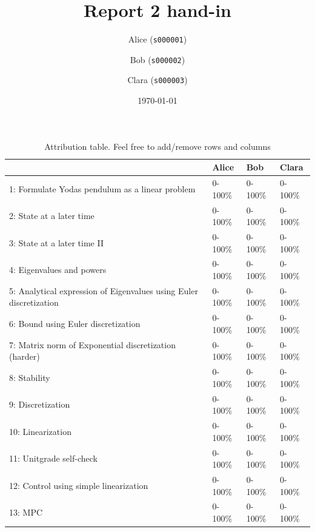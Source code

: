 \documentclass[12pt,twoside]{article}
\title{ Report 2 hand-in }
\date{ \today }
\author{Alice (\texttt{s000001})\and  Bob (\texttt{s000002})\and Clara (\texttt{s000003}) }
\begin{document}
\maketitle

\begin{table}[ht!]
\caption{Attribution table. Feel free to add/remove rows and columns}
\begin{tabular}{llll}
\toprule
                                                                    & Alice   & Bob    & Clara   \\
\midrule
 1: Formulate Yodas pendulum as a linear problem                    & 0-100\%  & 0-100\% & 0-100\%  \\
 2: State at a later time                                           & 0-100\%  & 0-100\% & 0-100\%  \\
 3: State at a later time II                                        & 0-100\%  & 0-100\% & 0-100\%  \\
 4: Eigenvalues and powers                                          & 0-100\%  & 0-100\% & 0-100\%  \\
 5: Analytical expression of Eigenvalues using Euler discretization & 0-100\%  & 0-100\% & 0-100\%  \\
 6: Bound using Euler discretization                                & 0-100\%  & 0-100\% & 0-100\%  \\
 7: Matrix norm of Exponential discretization (harder)              & 0-100\%  & 0-100\% & 0-100\%  \\
 8: Stability                                                       & 0-100\%  & 0-100\% & 0-100\%  \\
 9: Discretization                                                  & 0-100\%  & 0-100\% & 0-100\%  \\
 10: Linearization                                                  & 0-100\%  & 0-100\% & 0-100\%  \\
 11: Unitgrade self-check                                           & 0-100\%  & 0-100\% & 0-100\%  \\
 12: Control using simple linearization                             & 0-100\%  & 0-100\% & 0-100\%  \\
 13: MPC                                                            & 0-100\%  & 0-100\% & 0-100\%  \\
\bottomrule
\end{tabular}
\end{table}

\end{document}
